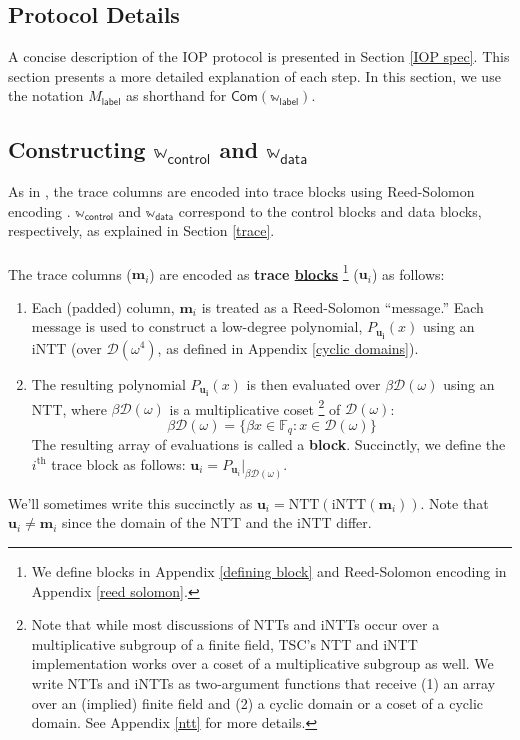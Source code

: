 \documentclass[10pt,letterpaper,titlepage]{article}
\newcommand{\GF}[1]{\mathbb{F}_{#1}}
\newcommand{\w}[0]{\omega}
\newcommand{\D}[0]{\mathcal{D}}
\theoremstyle{definition}
\begin{document}
\begin{appendices}
\section{Protocol Details}
A concise description of the IOP protocol is presented in Section \ref{IOP spec}. 
This section presents a more detailed explanation of each step. 
In this section, we use the notation $M_\mathsf{label}$ as shorthand for $\mathsf{Com}(\mathbb{w}_\mathsf{label})$.
\subsection{Constructing $\mathbb{w}_\mathsf{control}$ and $\mathbb{w}_\mathsf{data}$}
\label{committing trace}
As in \cite{stark}, the trace columns are encoded into trace blocks using Reed-Solomon encoding \cite{reed-solomon}. 
$\mathbb{w}_\mathsf{control}$ and $\mathbb{w}_\mathsf{data}$ correspond to the control blocks and data blocks, respectively, as explained in Section \ref{trace}.\\
\\
The trace columns ($\mathbf{m}_i$) are encoded as \textbf{trace \hyperref[blocks]{blocks}}%
\footnote{We define blocks in Appendix \ref{defining block} and Reed-Solomon encoding in Appendix \ref{reed solomon}.} ($\mathbf{u}_i$) as follows: 
\begin{enumerate}
\item Each (padded) column, $\mathbf{m}_i$ is treated as a Reed-Solomon\cite{reed-solomon} ``message.'' 
Each message is used to construct a low-degree polynomial, $P_{\mathbf{u_i}}(x)$ using an iNTT (over $\D(\w^4)$, as defined in Appendix \ref{cyclic domains}).
\item The resulting polynomial $P_{\mathbf{u_i}}(x)$ is then evaluated over $\beta\D(\w)$ using an NTT, where $\beta\D(\w)$ is a multiplicative coset%
\footnote{Note that while most discussions of NTTs and iNTTs occur over a multiplicative subgroup of a finite field, TSC's NTT and iNTT implementation works over a coset of a multiplicative subgroup as well. 
We write NTTs and iNTTs as two-argument functions that receive (1) an array over an (implied) finite field and (2) a cyclic domain or a coset of a cyclic domain. 
See Appendix \ref{ntt} for more details.} of $\D(\w)$:
\begin{equation*}
\beta\D(\w) = \{\beta x\in\GF{q} : x \in \D(\w)\}
\end{equation*}
The resulting array of evaluations is called a \textbf{block}. Succinctly, we define the $i^\text{th}$ trace block as follows: $\mathbf{u}_i = P_{\mathbf{u}_i}\big|_{\beta\D(\w)}$. 
\end{enumerate} 
We'll sometimes write this succinctly as $\mathbf{u}_i = \text{NTT}(\text{iNTT}(\mathbf{m}_i))$. 
Note that $\mathbf{u}_i \neq \mathbf{m}_i$ since the domain of the NTT and the iNTT differ. 

\end{appendices}
\end{document}
